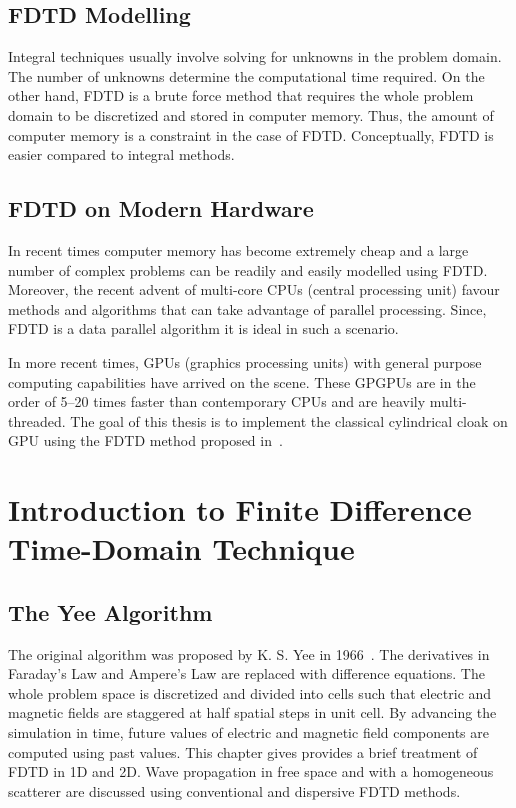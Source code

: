 \documentclass[10pt,A4paper]{report}
\begin{document}
\section{FDTD Modelling}
Integral techniques usually involve solving for unknowns in the problem domain. The number of unknowns determine the computational time required. On the other hand, FDTD is a brute force method that requires the whole problem domain to be discretized and stored in computer memory. Thus, the amount of computer memory is a constraint in the case of FDTD. Conceptually, FDTD is easier compared to integral methods.

\section{FDTD on Modern Hardware}
In recent times computer memory has become extremely cheap and a large number of complex problems can be readily and easily modelled using FDTD. Moreover, the recent advent of multi-core CPUs (central processing unit) favour methods and algorithms that can take advantage of parallel processing. Since, FDTD is a data parallel algorithm it is ideal in such a scenario.

In more recent times, GPUs (graphics processing units) with general purpose computing capabilities have arrived on the scene. These GPGPUs are in the order of 5--20 times faster than contemporary CPUs and are heavily multi-threaded. The goal of this thesis is to implement the classical cylindrical cloak on GPU using the FDTD method proposed in~\cite{Radial-Zhao}.

\chapter{Introduction to Finite Difference Time-Domain Technique}

\section{The Yee Algorithm}

The original algorithm was proposed by K. S. Yee in 1966~\cite{Yee1966}. The derivatives in Faraday's Law and Ampere's Law are replaced with difference equations. The whole problem space is discretized and divided into cells such that electric and magnetic fields are staggered at half spatial steps in unit cell. By advancing the simulation in time, future values of electric and magnetic field components are computed using past values. This chapter gives provides a brief treatment of FDTD in 1D and 2D. Wave propagation in free space and with a homogeneous scatterer are discussed using conventional and dispersive FDTD methods.
\end{document}
